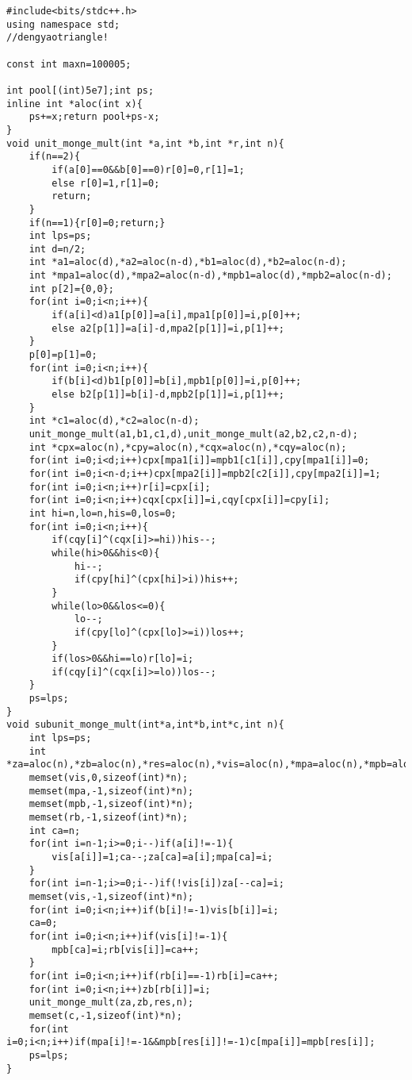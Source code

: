 \documentclass[12pt]{ctexart}
\begin{document}
\begin{lstlisting}
#include<bits/stdc++.h>
using namespace std;
//dengyaotriangle!

const int maxn=100005;

int pool[(int)5e7];int ps;
inline int *aloc(int x){
    ps+=x;return pool+ps-x;
}
void unit_monge_mult(int *a,int *b,int *r,int n){
    if(n==2){
        if(a[0]==0&&b[0]==0)r[0]=0,r[1]=1;
        else r[0]=1,r[1]=0;
        return;
    }
    if(n==1){r[0]=0;return;}
    int lps=ps;
    int d=n/2;
    int *a1=aloc(d),*a2=aloc(n-d),*b1=aloc(d),*b2=aloc(n-d);
    int *mpa1=aloc(d),*mpa2=aloc(n-d),*mpb1=aloc(d),*mpb2=aloc(n-d);
    int p[2]={0,0};
    for(int i=0;i<n;i++){
        if(a[i]<d)a1[p[0]]=a[i],mpa1[p[0]]=i,p[0]++;
        else a2[p[1]]=a[i]-d,mpa2[p[1]]=i,p[1]++;
    }
    p[0]=p[1]=0;
    for(int i=0;i<n;i++){
        if(b[i]<d)b1[p[0]]=b[i],mpb1[p[0]]=i,p[0]++;
        else b2[p[1]]=b[i]-d,mpb2[p[1]]=i,p[1]++;
    }
    int *c1=aloc(d),*c2=aloc(n-d);
    unit_monge_mult(a1,b1,c1,d),unit_monge_mult(a2,b2,c2,n-d);
    int *cpx=aloc(n),*cpy=aloc(n),*cqx=aloc(n),*cqy=aloc(n);
    for(int i=0;i<d;i++)cpx[mpa1[i]]=mpb1[c1[i]],cpy[mpa1[i]]=0;
    for(int i=0;i<n-d;i++)cpx[mpa2[i]]=mpb2[c2[i]],cpy[mpa2[i]]=1;
    for(int i=0;i<n;i++)r[i]=cpx[i];
    for(int i=0;i<n;i++)cqx[cpx[i]]=i,cqy[cpx[i]]=cpy[i];
    int hi=n,lo=n,his=0,los=0;
    for(int i=0;i<n;i++){
        if(cqy[i]^(cqx[i]>=hi))his--;
        while(hi>0&&his<0){
            hi--;
            if(cpy[hi]^(cpx[hi]>i))his++;
        }
        while(lo>0&&los<=0){
            lo--;
            if(cpy[lo]^(cpx[lo]>=i))los++;
        }
        if(los>0&&hi==lo)r[lo]=i;
        if(cqy[i]^(cqx[i]>=lo))los--;
    }
    ps=lps;
}
void subunit_monge_mult(int*a,int*b,int*c,int n){
    int lps=ps;
    int *za=aloc(n),*zb=aloc(n),*res=aloc(n),*vis=aloc(n),*mpa=aloc(n),*mpb=aloc(n),*rb=aloc(n);
    memset(vis,0,sizeof(int)*n);
    memset(mpa,-1,sizeof(int)*n);
    memset(mpb,-1,sizeof(int)*n);
    memset(rb,-1,sizeof(int)*n);
    int ca=n;
    for(int i=n-1;i>=0;i--)if(a[i]!=-1){
        vis[a[i]]=1;ca--;za[ca]=a[i];mpa[ca]=i;
    }
    for(int i=n-1;i>=0;i--)if(!vis[i])za[--ca]=i;
    memset(vis,-1,sizeof(int)*n);
    for(int i=0;i<n;i++)if(b[i]!=-1)vis[b[i]]=i;
    ca=0;
    for(int i=0;i<n;i++)if(vis[i]!=-1){
        mpb[ca]=i;rb[vis[i]]=ca++;
    }
    for(int i=0;i<n;i++)if(rb[i]==-1)rb[i]=ca++;
    for(int i=0;i<n;i++)zb[rb[i]]=i;
    unit_monge_mult(za,zb,res,n);
    memset(c,-1,sizeof(int)*n);
    for(int i=0;i<n;i++)if(mpa[i]!=-1&&mpb[res[i]]!=-1)c[mpa[i]]=mpb[res[i]];
    ps=lps;
}



\end{lstlisting}
\end{document}
